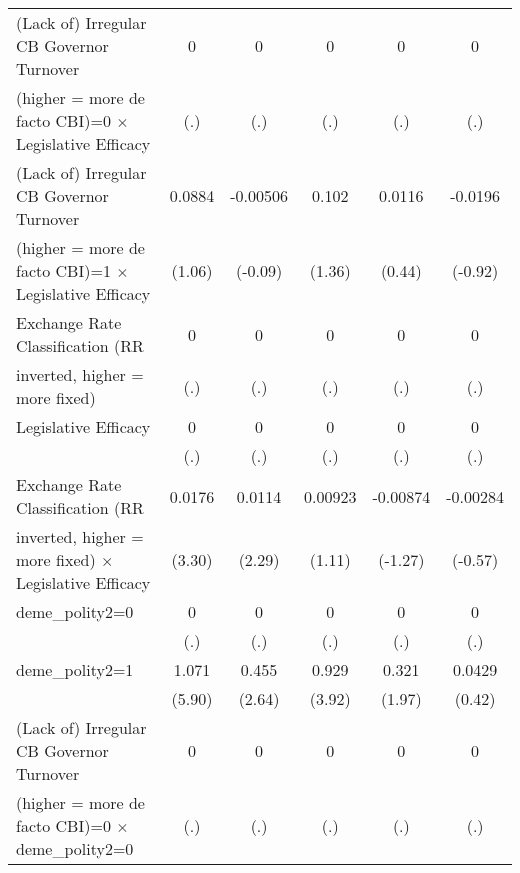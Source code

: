 {\begin{tabular}{l*{5}{c}}
\addlinespace
(Lack of) Irregular CB Governor Turnover&    0         &    0         &    0         &    0         &    0         \\
(higher = more de facto CBI)=0 $\times$ Legislative Efficacy&  (.)         &  (.)         &  (.)         &  (.)         &  (.)         \\
\addlinespace
(Lack of) Irregular CB Governor Turnover&0.0884         &-0.00506         &0.102         &0.0116         &-0.0196         \\
(higher = more de facto CBI)=1 $\times$ Legislative Efficacy&(1.06)         &(-0.09)         &(1.36)         &(0.44)         &(-0.92)         \\
\addlinespace
Exchange Rate Classification (RR        &    0         &    0         &    0         &    0         &    0         \\
inverted, higher = more fixed)          &  (.)         &  (.)         &  (.)         &  (.)         &  (.)         \\
\addlinespace
Legislative Efficacy                    &    0         &    0         &    0         &    0         &    0         \\
                                        &  (.)         &  (.)         &  (.)         &  (.)         &  (.)         \\
\addlinespace
Exchange Rate Classification (RR        &0.0176\sym{**} &0.0114\sym{*}  &0.00923         &-0.00874         &-0.00284         \\
inverted, higher = more fixed) $\times$ Legislative Efficacy&(3.30)         &(2.29)         &(1.11)         &(-1.27)         &(-0.57)         \\
\addlinespace
deme\_polity2=0                          &    0         &    0         &    0         &    0         &    0         \\
                                        &  (.)         &  (.)         &  (.)         &  (.)         &  (.)         \\
\addlinespace
deme\_polity2=1                          &1.071\sym{***}&0.455\sym{**} &0.929\sym{***}&0.321         &0.0429         \\
                                        &(5.90)         &(2.64)         &(3.92)         &(1.97)         &(0.42)         \\
\addlinespace
(Lack of) Irregular CB Governor Turnover&    0         &    0         &    0         &    0         &    0         \\
(higher = more de facto CBI)=0 $\times$ deme\_polity2=0&  (.)         &  (.)         &  (.)         &  (.)         &  (.)         \\

\end{tabular}}
